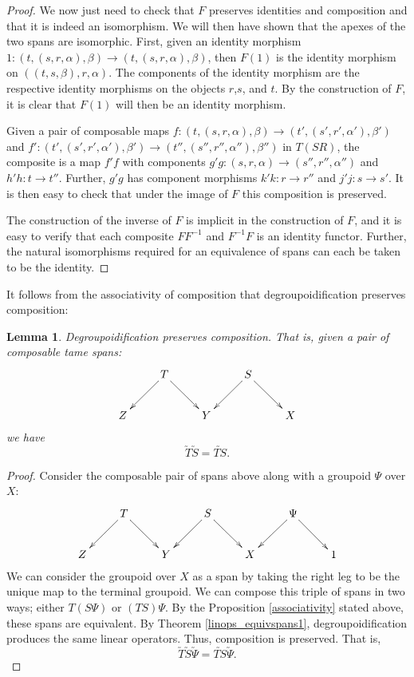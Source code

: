 \documentclass{article}
\renewcommand{\to}{\rightarrow}
\newcommand{\maps}{\colon}
\newtheorem{lemma}[thm]{Lemma}
\begin{document}
\begin{proof}
We now just need to check that $F$ preserves identities and
composition and that it is indeed an isomorphism.  We will then have
shown that the apexes of the two spans are isomorphic.  First, given
an identity morphism $1\maps (t,(s,r,\alpha),\beta) \to
(t,(s,r,\alpha),\beta)$, then $F(1)$ is the identity morphism on
$((t,s,\beta),r,\alpha)$.  The components of the identity morphism are
the respective identity morphisms on the objects $r$,$s$, and $t$.  By
the construction of $F$, it is clear that $F(1)$ will then be an
identity morphism.

Given a pair of composable maps $f \maps (t,(s,r,\alpha),\beta) \to
(t',(s',r',\alpha'),\beta')$ and $f' \maps (t',(s',r',\alpha'),\beta')
\to (t'',(s'',r'',\alpha''),\beta'')$ in $T(SR)$, the composite is a
map $f'f$ with components $g'g \maps (s,r,\alpha) \to
(s'',r'',\alpha'')$ and $h'h\maps t \to t''$.  Further, $g'g$ has
component morphisms $k'k \maps r\to r''$ and $j'j \maps s\to s'$.  It
is then easy to check that under the image of $F$ this composition is
preserved.

The construction of the inverse of $F$ is implicit in the construction
of $F$, and it is easy to verify that each composite $FF^{-1}$ and
$F^{-1}F$ is an identity functor.  Further, the natural isomorphisms
required for an equivalence of spans can each be taken to be the
identity.
\end{proof}

It follows from the associativity of composition that degroupoidification
preserves composition:

\begin{lemma}
\label{composition}
Degroupoidification preserves composition.  That is, given a 
pair of composable tame spans:
\[
\xymatrix{
  & T\ar[dr]\ar[dl]  &   & S\ar[dr]\ar[dl] & \\
Z &                  & Y &                 & X
}
\]   
we have
\[ \utilde{T}\utilde{S} = \utilde{TS}. \]
\end{lemma}
 
\begin{proof}
Consider the composable pair of spans above along with a groupoid $\Psi$
over $X$:
\[
\xymatrix{
  & T\ar[dr]\ar[dl]  &   & S\ar[dr]\ar[dl] &  & \Psi\ar[dr]\ar[dl] &\\
Z &                  & Y &                 & X &     & 1
}
\] 
We can consider the groupoid over $X$ as a span by taking the right leg
to be the unique map to the terminal groupoid.  We can compose this triple
of spans  in two ways; either $T(S\Psi)$ or $(TS)\Psi$.  By the
Proposition \ref{associativity} stated above, these spans are equivalent.
By Theorem \ref{linops_equivspans1}, degroupoidification produces the same linear operators.
Thus, composition is preserved.  That is,
\[ \utilde{T}\utilde{S}\utilde{\Psi} = \utilde{TS}\utilde{\Psi}. \]
\end{proof}
\end{document}
